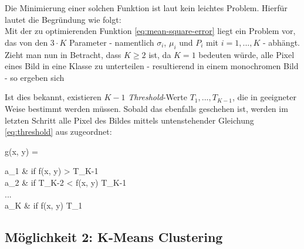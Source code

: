 		Die Minimierung einer solchen Funktion ist laut \cite{cuevas-meth1} kein leichtes Problem. Hierfür lautet die Begründung wie folgt:\\
		Mit der zu optimierenden Funktion \ref{eq:mean-square-error} liegt ein Problem vor, das von den $3 \cdot K$ Parameter - namentlich $\sigma_{i}$, $\mu_{i}$ und $P_{i}$ mit $i = 1, ... ,K$ - abhängt. Zieht man nun in Betracht, dass $K \geq 2$ ist, da $K = 1$ bedeuten würde, alle Pixel eines Bild in eine Klasse zu unterteilen - resultierend in einem monochromen Bild - so ergeben sich 
		
		Ist dies bekannt, existieren $K-1$ \textit{Threshold}-Werte $T_{1}, ... , T_{K-1}$, die in geeigneter Weise bestimmt werden müssen. Sobald das ebenfalls geschehen ist, werden im letzten Schritt alle Pixel des Bildes mittels untenstehender Gleichung \ref{eq:threshold} aus \cite[S. 739]{gonzalez-woods} zugeordnet:
		
		\begin{flalign}
			\centering
			g(x, y) = 
			\begin{cases}
				a_{1} & \textrm{if } f(x, y) > T_{K-1} \\
				a_{2} & \textrm{if } T_{K-2} < f(x, y) \leq T_{K-1} \\
				... \\
				a_{K} & \textrm{if } f(x, y) \leq T_{1}
			\end{cases}
			\label{eq:threshold}
		\end{flalign}
	
	\subsection{Möglichkeit 2: K-Means Clustering}
	\label{sec:meth2}